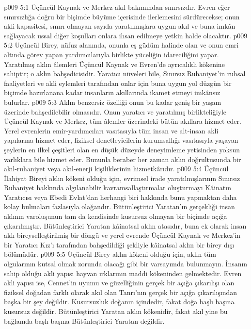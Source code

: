 \vs p009 5:1 Üçüncül Kaynak ve Merkez akıl bakımından sınırsızdır. Evren eğer sınırsızlığa doğru bir biçimde büyüme içerisinde ilerlemesini sürdürecekse; onun akli kapasitesi, sınırı olmayan sayıda yaratılmışlara uygun akıl ve buna imkân sağlayacak ussal diğer koşulları onlara ihsan edilmeye yetkin halde olacaktır.
\vs p009 5:2 Üçüncül Birey,  nüfuz alanında, onunla eş güdüm halinde olan ve onun emri altında görev yapan yardımcılarıyla birlikte yüceliğin idareciliğini yapar. Yaratılmış aklın âlemleri Üçüncül Kaynak ve Evren’de ayrıcalıklı kökenine sahiptir; o aklın bahşedicisidir. Yaratıcı nüveleri bile, Sınırsız Ruhaniyet’in ruhsal faaliyetleri ve akli eylemleri tarafından onlar için buna uygun yol düzgün bir biçimde hazırlanana kadar insanların akıllarında ikamet etmeyi imkânsız bulurlar.
\vs p009 5:3 Aklın benzersiz özelliği onun bu kadar geniş bir yaşam üzerinde bahşedilebilir olmasıdır. Onun yaratıcı ve yaratılmış birlikteliğiyle Üçüncül Kaynak ve Merkez, tüm âlemler üzerindeki bütün akıllara hizmet eder. Yerel evrenlerin emir\hyp{}yardımcıları vasıtasıyla tüm insan ve alt\hyp{}insan akli yapılarına hizmet eder, fiziksel denetleyicilerin kurumsallığı vasıtasıyla yaşayan şeylerin en ilkel çeşitleri olan en düşük düzeyde deneyimleme yetisinden yoksun varlıklara bile hizmet eder. Bununla beraber her zaman aklın doğrultusunda bir akıl\hyp{}ruhaniyet veya akıl\hyp{}enerji kişiliklerinin hizmetkârıdır.
\vs p009 5:4 Üçüncül İlahiyat Bireyi aklın kökeni olduğu için, evrimsel irade yaratılmışlarının Sınırsız Ruhaniyet hakkında algılanabilir kavramsallaştırmalar oluşturmayı Kâinatın Yaratıcısı veya Ebedi Evlat’dan herhangi biri hakkında bunu yapmaktan daha kolay bulmaları fazlasıyla olağandır. Bütünleştirici Yaratan’ın gerçekliği insan aklının varoluşunun tam da kendisinde kusursuz olmayan bir biçimde açığa çıkarılmıştır. Bütünleştirici Yaratan kâinatsal aklın atasıdır, buna ek olarak insan aklı bireyselleştirilmiş bir döngü ve yerel evrende Üçüncül Kaynak ve Merkez’in bir Yaratıcı Kız’ı tarafından bahşedildiği şekliyle kâinatsal aklın bir birey dışı bölümüdür.
\vs p009 5:5 Üçüncül Birey aklın kökeni olduğu için, aklın tüm olgularının kutsal olmak zorunda olacağı gibi bir varsayımda bulunmayın. İnsanın sahip olduğu akli yapısı hayvan ırklarının maddi kökeninden gelmektedir. Evren akli yapısı ise, Cennet’in uyumu ve güzelliğinin gerçek bir açığa çıkarılışı olan fiziksel doğadan farklı olarak akıl olan Tanrı’nın gerçek bir açığa çıkarılışından başka bir şey değildir. Kusursuzluk doğanın içindedir, fakat doğa başlı başına kusursuz değildir. Bütünleştirici Yaratan aklın kökenidir, fakat akıl yine bu bağlamda başlı başına Bütünleştirici Yaratan değildir.
